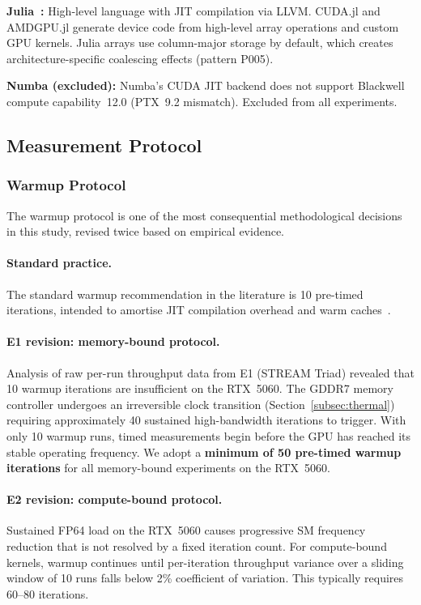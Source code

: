 \textbf{Julia~\cite{Bezanson2017}:} High-level language with JIT compilation
via LLVM. CUDA.jl and AMDGPU.jl generate device code from high-level array
operations and custom GPU kernels. Julia arrays use column-major storage by
default, which creates architecture-specific coalescing effects (pattern P005).

\textbf{Numba (excluded):} Numba's CUDA JIT backend does not support Blackwell
compute capability~12.0 (PTX~9.2 mismatch). Excluded from all experiments.

\subsection{Measurement Protocol}
\label{subsec:measurement}

\subsubsection{Warmup Protocol}
\label{subsubsec:warmup}

The warmup protocol is one of the most consequential methodological decisions
in this study, revised twice based on empirical evidence.

\paragraph{Standard practice.}
The standard warmup recommendation in the literature is 10 pre-timed
iterations, intended to amortise JIT compilation overhead and warm
caches~\cite{Godoy2023}.

\paragraph{E1 revision: memory-bound protocol.}
Analysis of raw per-run throughput data from E1 (STREAM Triad) revealed that
10 warmup iterations are insufficient on the RTX~5060. The GDDR7 memory
controller undergoes an irreversible clock transition (Section~\ref{subsec:thermal})
requiring approximately 40 sustained high-bandwidth iterations to trigger.
With only 10 warmup runs, timed measurements begin before the GPU has reached
its stable operating frequency. We adopt a \textbf{minimum of 50 pre-timed
warmup iterations} for all memory-bound experiments on the RTX~5060.

\paragraph{E2 revision: compute-bound protocol.}
Sustained FP64 load on the RTX~5060 causes progressive SM frequency reduction
that is not resolved by a fixed iteration count. For compute-bound kernels,
warmup continues until per-iteration throughput variance over a sliding window
of 10 runs falls below 2\% coefficient of variation. This typically requires
60--80 iterations.

